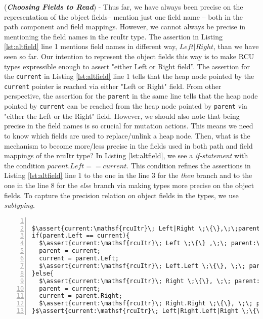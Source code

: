 (\textit{\textbf{Choosing Fields to Read}}) - Thus far, we have always been precise on the representation of the object fields-- mention just one field name -- both in the path component and field mappings. However, we cannot always be precise in mentioning the field names in the \textsf{rcuItr} type. The assertion in Listing \ref{lst:altfield} line 1 mentions field names in different way, $Left|Right$, than we have seen so far. Our intention to represent the object fields this way is to make \textsf{RCU} types expressible enough to assert "either Left or Right field''. The assertion for the \texttt{current} in Listing \ref{lst:altfield} line 1 tells that the heap node pointed by the \texttt{current} pointer is reached via either "Left or Right" field. From other perspective, the assertion for the \texttt{parent} in the same line tells that the heap node pointed by \texttt{current} can be reached from the heap node pointed by \texttt{parent} via "either the Left or the Right" field.
However, we should also note that being precise in the field names is so crucial for mutation actions. This means we need to know which fields are used to replace/unlink a heap node. Then, what is the mechanism to become more/less precise in the fields used in both path and field mappings of the \textsf{rcuItr} type? In Listing \ref{lst:altfield}, we see a \textit{if-statement} with the condition $parent.Left == current$. This condition refines the assertions in Listing \ref{lst:altfield} line 1 to the one in the line 3 for the \textit{then} branch and to the one in the line 8 for the \textit{else} branch via making types more precise on the object fields.
To capture the precision relation on object fields in the types, we use \textit{subtyping}.
\begin{lstlisting}[caption={Choosing fields to read},label={lst:altfield}, numbers=left, numberstyle=\tiny\color{red}, numbersep=5pt]%, basicstyle=\scriptsize]

$\assert{current:\mathsf{rcuItr}\; Left|Right \;\{\},\;\;parent:\mathsf{rcuItr}\;  \epsilon \;\{Left|Right\mapsto current\}}$
if(parent.Left == current){
  $\assert{current:\mathsf{rcuItr}\; Left \;\{\} ,\;\; parent:\mathsf{rcuItr}\;  \epsilon \;\{Left\mapsto current\}}$
  parent = current;
  current = parent.Left;
  $\assert{current:\mathsf{rcuItr}\; Left.Left \;\{\}, \;\; parent:\mathsf{rcuItr}\;  Left \;\{Left\mapsto current\}}$
}else{
  $\assert{current:\mathsf{rcuItr}\; Right \;\{\}, \;\; parent:\mathsf{rcuItr}\;  \epsilon \;\{Right\mapsto current\}}$
  parent = current;
  current = parent.Right;
  $\assert{current:\mathsf{rcuItr}\; Right.Right \;\{\}, \;\; parent:\mathsf{rcuItr}\;  Right \;\{Right\mapsto current\}}$
}$\assert{current:\mathsf{rcuItr}\; Left|Right.Left|Right \;\{\}, \;\; parent:\mathsf{rcuItr}\;  Left|Right \;\{Left|Right\mapsto current\}}$
\end{lstlisting}

